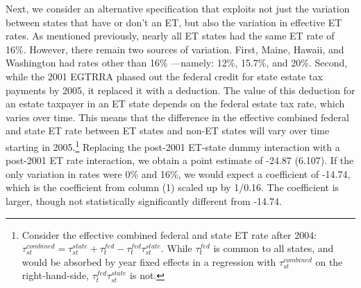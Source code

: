 \documentclass[12pt]{article}
\begin{document}
Next, we consider an alternative specification that exploits not just the variation between states that have or don't an ET, but also the variation in effective ET rates. As mentioned previously, nearly all ET states had the same ET rate of 16\%. However, there remain two sources of variation. First, Maine, Hawaii, and Washington had rates other than 16\% ---namely: 12\%, 15.7\%, and 20\%. Second, while the 2001 EGTRRA phased out the federal credit for state estate tax payments by 2005, it replaced it with a deduction. The value of this deduction for an estate taxpayer in an ET state depends on the federal estate tax rate, which varies over time. This means that the difference in the effective combined federal and state ET rate between ET states and non-ET states will vary over time starting in 2005.\footnote{Consider the effective combined federal and state ET rate after 2004:
$\tau^{combined}_{st} = \tau^{state}_{st} + \tau^{fed}_{t} - \tau^{fed}_{t} \tau^{state}_{st}.$
While $\tau^{fed}_{t}$ is common to all states, and would be absorbed by year fixed effects in a regression with $\tau^{combined}_{st}$ on the right-hand-side, $\tau^{fed}_{t} \tau^{state}_{st}$ is not.}
Replacing the post-2001 ET-state dummy interaction with a post-2001 ET rate interaction, we obtain a point estimate of -24.87 (6.107). If the only variation in rates were 0\% and 16\%, we would expect a coefficient of -14.74, which is the coefficient from column (1) scaled up by 1/0.16. The coefficient is larger, though not statistically significantly different from -14.74.
\end{document}
